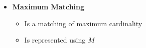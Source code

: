 \documentclass[12pt]{article}
\begin{document}
\begin{enumerate}[1.]
\begin{enumerate}[a)]
\begin{itemize}
            \item \textbf{Maximum Matching}

            \begin{itemize}
                \item Is a matching of maximum cardinality
                \item Is represented using $M$
            \end{itemize}
        \end{itemize}


    \end{enumerate}


\end{enumerate}
\end{document}
